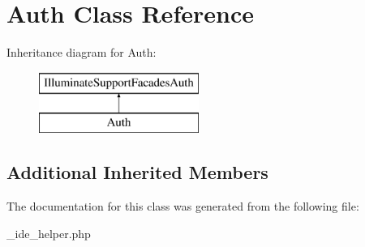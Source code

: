 \hypertarget{class_auth}{}\section{Auth Class Reference}
\label{class_auth}
Inheritance diagram for Auth\+:\begin{figure}[H]
\begin{center}
\leavevmode
\includegraphics[height=2.000000cm]{class_auth}
\end{center}
\end{figure}
\subsection*{Additional Inherited Members}


The documentation for this class was generated from the following file\+:\begin{DoxyCompactItemize}
\item 
\+\_\+ide\+\_\+helper.\+php\end{DoxyCompactItemize}
